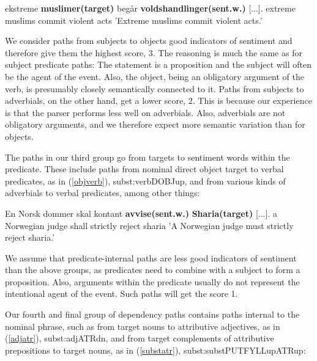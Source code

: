 \documentclass[11pt]{article}
\begin{document}
\begin{examples}
\item\label{subjobj}
\gll [...] ekstreme \textbf{muslimer(target)} beg{\aa}r \textbf{voldshandlinger(sent.w.)} [...].
{} extreme muslims commit {violent acts} {}
\glt 'Extreme muslims commit violent acts.'
\glend
\end{examples}

We consider paths from subjects to objects good indicators of sentiment and therefore give them the highest score, 3. The reasoning is much the same as for subject predicate paths: The statement is a proposition and the subject will often be the agent of the event. Also, the object, being an obligatory argument of the verb, is presumably closely semantically connected to it. Paths from subjects to adverbials, on the other hand, get a lower score, 2. This is because our experience is that the parser performs less well on adverbials. Also, adverbials are not obligatory arguments, and we therefore expect more semantic variation than for objects.

The paths in our third group go from targets to sentiment words within the predicate. These include paths from nominal direct object target to verbal predicates, as in (\ref{objverb}), subst:verb{\textunderscore}{\textunderscore}DOBJ{\textunderscore}up, and from various kinds of adverbials to verbal predicates, among other things:

\begin{examples}
\item\label{objverb}
\gll En Norsk dommer skal kontant \textbf{avvise(sent.w.)} \textbf{Sharia(target)} [...].
a Norwegian judge shall strictly reject sharia {}
\glt 'A Norwegian judge must strictly reject sharia.'
\glend
\end{examples}

We assume that predicate-internal paths are less good indicators of sentiment than the above groups, as predicates need to combine with a subject to form a proposition. Also, arguments within the predicate usually do not represent the intentional agent of the event. Such paths will get the score 1.

Our fourth and final group of dependency paths contains paths internal to the nominal phrase, such as from target nouns to attributive adjectives, as in (\ref{adjatr}), subst:adj{\textunderscore}{\textunderscore}ATR{\textunderscore}dn, and from target complements of attributive prepositions to target nouns, as in (\ref{substatr}), subst:subst{\textunderscore}{\textunderscore}PUTFYLL{\textunderscore}up{\textunderscore}{\textunderscore}ATR{\textunderscore}up:
\end{document}
